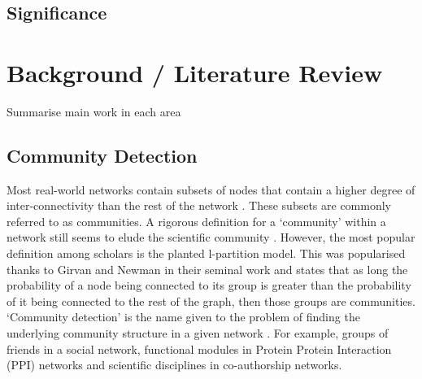 \documentclass{report}
\begin{document}
	
	\section{Significance}
	
	
	
	
	\chapter{Background / Literature Review}
	
	Summarise main work in each area 
	
	

	
	
	\section{Community Detection}
	
	Most real-world networks contain subsets of nodes that contain a higher degree of inter-connectivity than the rest of the network
	\cite{palla2005uncovering,lancichinetti2009detecting}.
	These subsets are commonly referred to as communities. 
	A rigorous definition for a `community' within a network still seems to elude the scientific community \cite{lancichinetti2009detecting}.
	However, the most popular definition among scholars is the planted l-partition model. 
	This was popularised thanks to Girvan and Newman in their seminal work \cite{girvan2002community} and states that as long the probability of a node being connected to its group is greater than the probability of it being connected to the rest of the graph, then those groups are communities. 
	`Community detection' is the name given to the problem of finding the underlying community structure in a given network \cite{girvan2002community}. 
	For example, groups of friends in a social network, functional modules in Protein Protein Interaction (PPI) networks and scientific disciplines in co-authorship networks.
	
\end{document}
